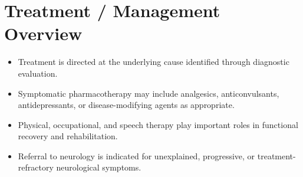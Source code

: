 \section*{Treatment / Management Overview}
\begin{itemize}
  \item Treatment is directed at the underlying cause identified through diagnostic evaluation.
  \item Symptomatic pharmacotherapy may include analgesics, anticonvulsants, antidepressants, or disease-modifying agents as appropriate.
  \item Physical, occupational, and speech therapy play important roles in functional recovery and rehabilitation.
  \item Referral to neurology is indicated for unexplained, progressive, or treatment-refractory neurological symptoms.
\end{itemize}

\clearpage
